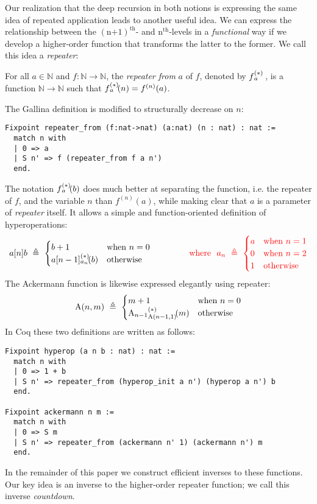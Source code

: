 Our realization that the deep recursion in both notions is expressing the same idea
of repeated application leads to another useful idea.  We can express the relationship 
between the $(\text{n+1})^{\text{th}}$- and $\text{n}^{\text{th}}$-levels in 
a \emph{functional} way if we develop a higher-order function that transforms the latter 
to the former.  We call this idea a \emph{repeater}:
\begin{defn}
For all $a\in \mathbb{N}$ and $f: \mathbb{N}\to \mathbb{N}$, the \emph{repeater from} $a$ of $f$, denoted by $\rf{f}{a}$ , is a function $\mathbb{N}\to \mathbb{N}$ such that $\rf{f}{a}(n) = f^{(n)}(a)$.
\end{defn}
The Gallina definition is modified to structurally decrease on $n$:
\begin{lstlisting}
Fixpoint repeater_from (f:nat->nat) (a:nat) (n : nat) : nat :=
  match n with
  | 0 => a
  | S n' => f (repeater_from f a n')
  end.
\end{lstlisting}
The notation $\rf{f}{a}(b)$ does much better at separating the function, i.e. the repeater of $f$, and the variable $n$ than $f^{(n)}(a)$, while making clear that $a$ is a parameter of \emph{repeater} itself. It allows a simple and function-oriented definition of hyperoperations:
\begin{equation*}
a[n]b ~ \triangleq ~ \begin{cases}
b + 1 & \text{when } n = 0 \\
\rf{a[n-1]}{a_n}(b) & \text{otherwise}
\end{cases}
{\color{red}\qquad \qquad \text{ where } \ a_n ~ \triangleq ~ \begin{cases}
a & \text{when } n = 1 \\
0 & \text{when } n = 2 \\
1 & \text{otherwise}
\end{cases}}
\end{equation*}
The Ackermann function is likewise expressed elegantly using repeater:
\begin{equation*}
\Ack(n,m) ~ \triangleq ~ \begin{cases}
m + 1 & \text{when } n = 0 \\
\rf{\Ack_{n-1}}{\Ack(n-1,1)}(m) & \text{otherwise}
\end{cases}
\end{equation*}
In Coq these two definitions are written as follows:
\begin{lstlisting}
Fixpoint hyperop (a n b : nat) : nat :=
  match n with
  | 0 => 1 + b
  | S n' => repeater_from (hyperop_init a n') (hyperop a n') b
  end.

Fixpoint ackermann n m :=
  match n with
  | 0 => S m
  | S n' => repeater_from (ackermann n' 1) (ackermann n') m
  end.
\end{lstlisting}
In the remainder of this paper we construct efficient inverses to these 
functions.  Our key idea is an inverse to the higher-order repeater function; we call this inverse \emph{countdown}.

